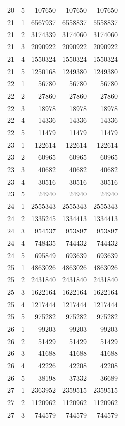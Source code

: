 \begin{longtable}{rrrrr}
20 & 5 & 107650 & 107650 & 107650 \\
21 & 1 & 6567937 & 6558837 & 6558837 \\
21 & 2 & 3174339 & 3174060 & 3174060 \\
21 & 3 & 2090922 & 2090922 & 2090922 \\
21 & 4 & 1550324 & 1550324 & 1550324 \\
21 & 5 & 1250168 & 1249380 & 1249380 \\
22 & 1 & 56780 & 56780 & 56780 \\
22 & 2 & 27860 & 27860 & 27860 \\
22 & 3 & 18978 & 18978 & 18978 \\
22 & 4 & 14336 & 14336 & 14336 \\
22 & 5 & 11479 & 11479 & 11479 \\
23 & 1 & 122614 & 122614 & 122614 \\
23 & 2 & 60965 & 60965 & 60965 \\
23 & 3 & 40682 & 40682 & 40682 \\
23 & 4 & 30516 & 30516 & 30516 \\
23 & 5 & 24940 & 24940 & 24940 \\
24 & 1 & 2555343 & 2555343 & 2555343 \\
24 & 2 & 1335245 & 1334413 & 1334413 \\
24 & 3 & 954537 & 953897 & 953897 \\
24 & 4 & 748435 & 744432 & 744432 \\
24 & 5 & 695849 & 693639 & 693639 \\
25 & 1 & 4863026 & 4863026 & 4863026 \\
25 & 2 & 2431840 & 2431840 & 2431840 \\
25 & 3 & 1622164 & 1622164 & 1622164 \\
25 & 4 & 1217444 & 1217444 & 1217444 \\
25 & 5 & 975282 & 975282 & 975282 \\
26 & 1 & 99203 & 99203 & 99203 \\
26 & 2 & 51429 & 51429 & 51429 \\
26 & 3 & 41688 & 41688 & 41688 \\
26 & 4 & 42226 & 42208 & 42208 \\
26 & 5 & 38198 & 37332 & 36689 \\
27 & 1 & 2363952 & 2359515 & 2359515 \\
27 & 2 & 1120962 & 1120962 & 1120962 \\
27 & 3 & 744579 & 744579 & 744579 \\

\end{longtable}
